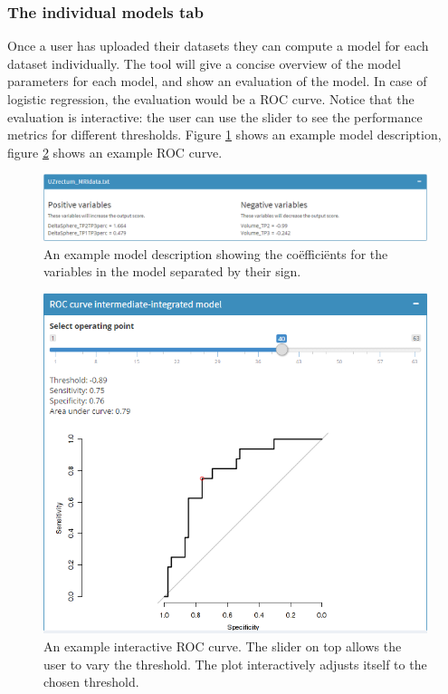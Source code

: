 \subsubsection{The individual models tab}
Once a user has uploaded their datasets they can compute a model for each dataset individually. The tool will give a concise overview of the model parameters for each model, and show an evaluation of the model. In case of logistic regression, the evaluation would be a ROC curve. Notice that the evaluation is interactive: the user can use the slider to see the performance metrics for different thresholds. Figure \ref{fig:tool-model} shows an example model description, figure \ref{fig:tool-roc} shows an example ROC curve.
\begin{figure}
	\centering
	\includegraphics[scale=.4]{images/tool_model_mri}
	\caption{An example model description showing the co\"effici\"ents for the variables in the model separated by their sign.}
	\label{fig:tool-model}
\end{figure}
\begin{figure}
	\centering
	\includegraphics[scale=.65]{images/tool_auc}
	\caption{An example interactive ROC curve. The slider on top allows the user to vary the threshold. The plot interactively adjusts itself to the chosen threshold.}
	\label{fig:tool-roc}
\end{figure}

